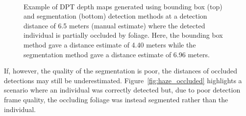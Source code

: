 \begin{figure}[htbp]
    \centering
    \\[1mm]
    \caption{Example of DPT depth maps generated using bounding box (top) and segmentation
        (bottom) detection methods at a detection distance of 6.5 meters (manual estimate)
        where the detected individual is partially occluded by foliage. Here, the bounding
        box method gave a distance estimate of 4.40 meters while the segmentation method
        gave a distance estimate of 6.96 meters.}
    \label{fig:bbox_vs_seg_occluded}
\end{figure}

If, however, the quality of the segmentation is poor, the distances of occluded detections
may still be underestimated.
Figure~\ref{fig:haze_occluded} highlights a scenario where an individual was correctly detected
but, due to poor detection frame quality, the occluding foliage was instead segmented rather
than the individual.

